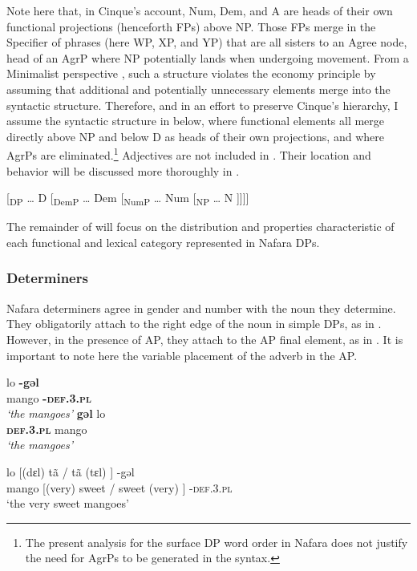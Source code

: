 \documentclass[output=paper]{langscibook}
\begin{document}
Note here that, in Cinque’s account, Num, Dem, and A are heads of their own functional projections (henceforth FPs) above NP. Those FPs merge in the Specifier of phrases (here WP, XP, and YP) that are all sisters to an Agree node, head of an AgrP where NP potentially lands when undergoing movement. From a Minimalist perspective \citep{Chomsky1995}, such a structure violates the economy principle by assuming that additional and potentially unnecessary elements merge into the syntactic structure. Therefore, and in an effort to preserve Cinque’s hierarchy, I assume the syntactic structure in  below, where functional elements all merge directly above NP and below D as heads of their own projections, and where AgrPs are eliminated.\footnote{The present analysis for the surface DP word order in Nafara does not justify the need for AgrPs to be generated in the syntax.} Adjectives are not included in . Their location and behavior will be discussed more thoroughly in .


\ea{} \label{ex:baron:2}
 [\textsubscript{DP} … D [\textsubscript{DemP} … Dem [\textsubscript{NumP} … Num [\textsubscript{NP} … N ]]]]
\z

The remainder of  will focus on the distribution and properties characteristic of each functional and lexical category represented in Nafara DPs. 


\subsubsection{Determiners}
\label{sec:baron:2.1.2}
Nafara determiners agree in gender and number with the noun they determine. They obligatorily attach to the right edge of the noun in simple DPs, as in . However, in the presence of AP, they attach to the AP final element, as in . It is important to note here the variable placement of the adverb in the AP.


\ea\label{ex:baron:3}
  \ea
  \gll lo  \textbf{-gəl}\\
    mango \textbf{-}\textbf{\textsc{def.3.pl}}\\
  \glt \textit{‘the} \textit{mangoes’}     
 \ex
 \gll *\textbf{gəl}    lo          \\
   \textbf{\textsc{def.3.pl}}   mango \\ 
  \glt \textit{‘the} \textit{mangoes’}
\z
\z

\ea\label{ex:baron:4}
\gll   lo [(dɛl) tã     / tã   (tɛl) ]  -gəl \\
   mango [(very) sweet / sweet (very) ] -\textsc{def}.3.\textsc{pl}\\
 \glt  ‘the very sweet mangoes’  
\z
\end{document}
